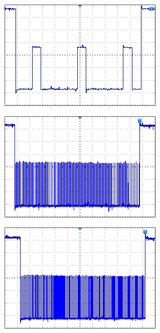 \documentclass[11pt,a4paper,oneside]{article}
\begin{document}
\begin{figure}[H]
  \begin{subfigure}[b]{0.33\textwidth}
    \centering
    \includegraphics[width=\textwidth]{images/line_periodo_1}
    \label{fig:line-per-1}
  \end{subfigure}
  \begin{subfigure}[b]{0.33\textwidth}
    \centering
    \includegraphics[width=\textwidth]{images/line_periodo_2}
    \label{fig:line-per-2}
  \end{subfigure}
  \begin{subfigure}[b]{0.33\textwidth}
    \centering
    \includegraphics[width=\textwidth]{images/line_periodo_3}

\end{subfigure}
\end{figure}
\end{document}
